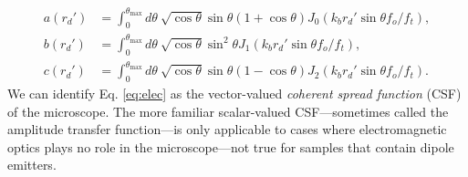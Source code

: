 \documentclass[11pt]{article}
\begin{document}
\begin{align}
  a(r_d') &= \int_0^{\theta_{\text{max}}}d\theta\ \sqrt{\cos\theta}\sin\theta(1+\cos\theta)J_0(k_b r_d'\sin\theta f_o/f_t),\\%
  b(r_d') &= \int_0^{\theta_{\text{max}}}d\theta\ \sqrt{\cos\theta}\sin^2\theta J_1(k_b r_d'\sin\theta f_o/f_t),\\%
  c(r_d') &= \int_0^{\theta_{\text{max}}}d\theta\ \sqrt{\cos\theta}\sin\theta(1-\cos\theta)J_2(k_b r_d'\sin\theta f_o/f_t).%
\end{align}
We can identify Eq. \ref{eq:elec} as the vector-valued \textit{coherent spread
  function} (CSF) of the microscope. The more familiar scalar-valued
CSF---sometimes called the amplitude transfer function---is only applicable to
cases where electromagnetic optics plays no role in the microscope---not true
for samples that contain dipole emitters.
\end{document}
